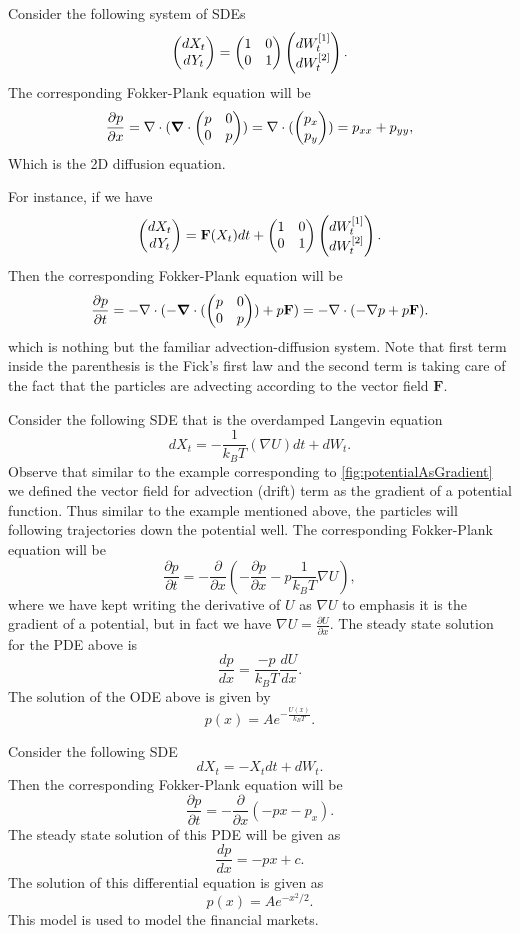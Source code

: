\begin{example}
	Consider the following system of SDEs
	\[ \begin{pmatrix} dX_t \\ dY_t \end{pmatrix} = \begin{pmatrix} 1 & 0 \\ 0 & 1 \end{pmatrix}\begin{pmatrix} dW^{[1]}_t \\ dW^{[2]}_t \end{pmatrix}. \]
	The corresponding Fokker-Plank equation will be
	\[ \frac{\partial p}{\partial x} = \nabla\cdot(\boldsymbol{\nabla}\cdot\begin{pmatrix} p & 0 \\ 0 & p \end{pmatrix}) 
	= \nabla\cdot(\begin{pmatrix} p_x \\ p_y \end{pmatrix}) = p_{xx} + p_{yy},
	 \]
	Which is the 2D diffusion equation.
\end{example}

\begin{example}
	For instance, if we have
	\[ \begin{pmatrix} dX_t \\ dY_t \end{pmatrix} = \mathbf{F}(X_t)dt +  \begin{pmatrix} 1 & 0 \\ 0 & 1 \end{pmatrix}\begin{pmatrix} dW^{[1]}_t \\ dW^{[2]}_t \end{pmatrix}. \]
	Then the corresponding Fokker-Plank equation will be
	\[ \frac{\partial p}{\partial t} = -\nabla\cdot( -\boldsymbol{\nabla}\cdot(\begin{pmatrix} p & 0 \\ 0 & p \end{pmatrix}) + p\mathbf{F}) = -\nabla\cdot(-\nabla p + p\mathbf{F}). \]
	which is nothing but the familiar advection-diffusion system. Note that first term inside the parenthesis is the Fick's first law and the second term is taking care of the fact that the particles are advecting according to the vector field $ \mathbf{F} $.
\end{example}

\begin{example}
	Consider the following SDE that is the overdamped Langevin equation
	\[ dX_t = -\frac{1}{k_BT}(\nabla U) dt + dW_t. \]
	Observe that similar to the example corresponding to \autoref{fig:potentialAsGradient} we defined the vector field for advection (drift) term as the gradient of a potential function. Thus similar to the example mentioned above, the particles will following trajectories down the potential well. The corresponding Fokker-Plank equation will be
	\[ \frac{\partial p}{\partial t} = -\frac{\partial}{\partial x}(-\frac{\partial p}{\partial x} - p\frac{1}{k_BT}\nabla U ), \]
	where we have kept writing the derivative of $ U $ as $ \nabla U $ to emphasis it is the gradient of a potential, but in fact we have $ \nabla U = \frac{\partial U}{\partial x} $. The steady state solution for the PDE above is
	\[ \frac{d p}{d x} = \frac{-p}{k_BT}\frac{d U}{d x}. \]
	The solution of the ODE above is given by
	\[\boxed{ p(x) = A e^{-\frac{U(x)}{k_BT}}}. \]
\end{example}

\begin{example}
	Consider the following SDE
	\[ dX_t = -X_tdt + dW_t. \]
	Then the corresponding Fokker-Plank equation will be
	\[ \frac{\partial p}{\partial t} = -\frac{\partial}{\partial x}(-px - p_x). \]
	The steady state solution of this PDE will be given as
	\[ \frac{d p}{dx}  = - p x + c.\]
	The solution of this differential equation is given as
	\[ \boxed{p(x) = A e^{-x^2/2}}. \]
	This model is used to model the financial markets.
\end{example}


